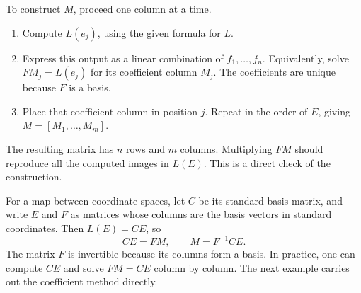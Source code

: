 To construct \(M\), proceed one column at a time.
\begin{enumerate}[(1)][1]
  \item Compute \(L(e_j)\), using the given formula for \(L\).
  \item Express this output as a linear combination of
    \(f_1,\ldots,f_n\). Equivalently, solve
    \(FM_j=L(e_j)\) for its coefficient column \(M_j\).
    The coefficients are unique because \(F\) is a basis.
  \item Place that coefficient column in position \(j\).
    Repeat in the order of \(E\), giving \(M=[M_1,\ldots,M_m]\).
\end{enumerate}
The resulting matrix has \(n\) rows and \(m\) columns.
Multiplying \(FM\) should reproduce all the computed images in \(L(E)\).
This is a direct check of the construction.

For a map between coordinate spaces, let \(C\) be its standard-basis
matrix, and write \(E\) and \(F\) as matrices whose columns are the
basis vectors in standard coordinates. Then \(L(E)=CE\), so
\[
  CE=FM,\qquad M=F^{-1}CE.
\]
The matrix \(F\) is invertible because its columns form a basis.
In practice, one can compute \(CE\) and solve \(FM=CE\) column by
column. The next example carries out the coefficient method directly.

